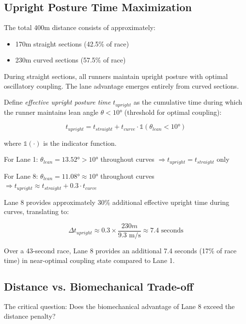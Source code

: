 \subsection{Upright Posture Time Maximization}

The total 400m distance consists of approximately:
\begin{itemize}
    \item 170m straight sections (42.5\% of race)
    \item 230m curved sections (57.5\% of race)
\end{itemize}

During straight sections, all runners maintain upright posture with optimal oscillatory coupling. The lane advantage emerges entirely from curved sections.

Define \textit{effective upright posture time} $t_{upright}$ as the cumulative time during which the runner maintains lean angle $\theta < 10°$ (threshold for optimal coupling):

\begin{equation}
t_{upright} = t_{straight} + t_{curve} \cdot \mathbb{1}(\theta_{lean} < 10°)
\end{equation}

where $\mathbb{1}(\cdot)$ is the indicator function.

For Lane 1: $\theta_{lean} = 13.52° > 10°$ throughout curves $\Rightarrow t_{upright} = t_{straight}$ only

For Lane 8: $\theta_{lean} = 11.08° \approx 10°$ throughout curves $\Rightarrow t_{upright} \approx t_{straight} + 0.3 \cdot t_{curve}$

Lane 8 provides approximately 30\% additional effective upright time during curves, translating to:

\begin{equation}
\Delta t_{upright} \approx 0.3 \times \frac{230m}{9.3 \text{ m/s}} \approx 7.4 \text{ seconds}
\end{equation}

Over a 43-second race, Lane 8 provides an additional 7.4 seconds (17\% of race time) in near-optimal coupling state compared to Lane 1.

\subsection{Distance vs. Biomechanical Trade-off}

The critical question: Does the biomechanical advantage of Lane 8 exceed the distance penalty?


